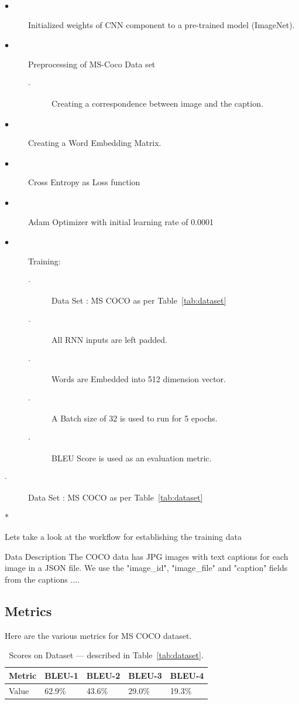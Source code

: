 \begin{description}
  \item[$\bullet$ ] Initialized weights of CNN component to a pre-trained model (ImageNet).
  \item[$\bullet$ ] Preprocessing of MS-Coco Data set
  	\begin{description}
    	\item[$\cdot$ ] Creating a correspondence between image and the caption.
    \end{description}
  \item[$\bullet$ ] Creating a Word Embedding Matrix.
  \item[$\bullet$ ] Cross Entropy as Loss function
  \item[$\bullet$ ] Adam Optimizer with initial learning rate of 0.0001
  \item[$\bullet$ ] Training: 
    \begin{description}
      	\item[$\cdot$ ] Data Set : MS COCO as per Table~\ref{tab:dataset}
      	\item[$\cdot$ ] All RNN inputs are left padded.
      	\item[$\cdot$ ] Words are Embedded into 512 dimension vector.
      	\item[$\cdot$ ] A Batch size of 32 is used to run for 5 epochs.
      	\item[$\cdot$ ] BLEU Score is used as an evaluation metric.
    \end{description}
  \item[$\cdot$ ] Data Set : MS COCO as per Table~\ref{tab:dataset}
  \item[$\ast$ ]
\end{description}

Lets take a look at the workflow for establishing the training data

Data Description
The COCO data has JPG images with text captions for each image in a JSON file. We use the "image\_id", "image\_file" and "caption" fields from the captions .... 





\subsection{Metrics}
Here are the various metrics for MS COCO dataset. 
\begin{table}[h!]
\centering
\begin{tabular}{l|l|l|l|l}
Metric & BLEU-1 & BLEU-2 & BLEU-3 & BLEU-4  \\\hline
Value & 62.9\% & 43.6\% & 29.0\% & 19.3\% \\
\end{tabular}
\caption{\label{tab:metrics}Scores on Dataset --- described in Table~\ref{tab:dataset}.}
\end{table}

